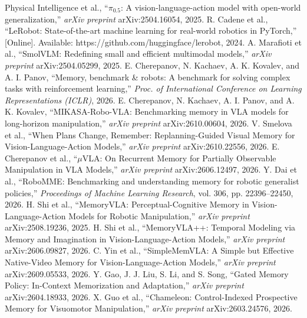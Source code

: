 \documentclass{IJCAS}
\begin{document}
\begin{reference}
 Physical Intelligence et al., ``$\pi_{0.5}$: A vision-language-action model with open-world generalization,'' \textit{arXiv preprint} arXiv:2504.16054, 2025.
 R. Cadene et al., ``LeRobot: State-of-the-art machine learning for real-world robotics in PyTorch,'' [Online]. Available: https://github.com/huggingface/lerobot, 2024.
 A. Marafioti et al., ``SmolVLM: Redefining small and efficient multimodal models,'' \textit{arXiv preprint} arXiv:2504.05299, 2025.
 E. Cherepanov, N. Kachaev, A. K. Kovalev, and A. I. Panov, ``Memory, benchmark \& robots: A benchmark for solving complex tasks with reinforcement learning,'' \textit{Proc. of International Conference on Learning Representations (ICLR)}, 2026.
 E. Cherepanov, N. Kachaev, A. I. Panov, and A. K. Kovalev, ``MIKASA-Robo-VLA: Benchmarking memory in VLA models for long-horizon manipulation,'' \textit{arXiv preprint} arXiv:2610.00604, 2026.
 V. Smelova et al., ``When Plans Change, Remember: Replanning-Guided Visual Memory for Vision-Language-Action Models,'' \textit{arXiv preprint} arXiv:2610.22556, 2026.
 E. Cherepanov et al., ``$\mu$VLA: On Recurrent Memory for Partially Observable Manipulation in VLA Models,'' \textit{arXiv preprint} arXiv:2606.12497, 2026.
 Y. Dai et al., ``RoboMME: Benchmarking and understanding memory for robotic generalist policies,'' \textit{Proceedings of Machine Learning Research}, vol. 306, pp. 22396--22450, 2026.
 H. Shi et al., ``MemoryVLA: Perceptual-Cognitive Memory in Vision-Language-Action Models for Robotic Manipulation,'' \textit{arXiv preprint} arXiv:2508.19236, 2025.
 H. Shi et al., ``MemoryVLA++: Temporal Modeling via Memory and Imagination in Vision-Language-Action Models,'' \textit{arXiv preprint} arXiv:2606.09827, 2026.
 C. Yin et al., ``SimpleMemVLA: A Simple but Effective Native-Video Memory for Vision-Language-Action Models,'' \textit{arXiv preprint} arXiv:2609.05533, 2026.
 Y. Gao, J. J. Liu, S. Li, and S. Song, ``Gated Memory Policy: In-Context Memorization and Adaptation,'' \textit{arXiv preprint} arXiv:2604.18933, 2026.
 X. Guo et al., ``Chameleon: Control-Indexed Prospective Memory for Visuomotor Manipulation,'' \textit{arXiv preprint} arXiv:2603.24576, 2026.
\end{reference}
\end{document}
